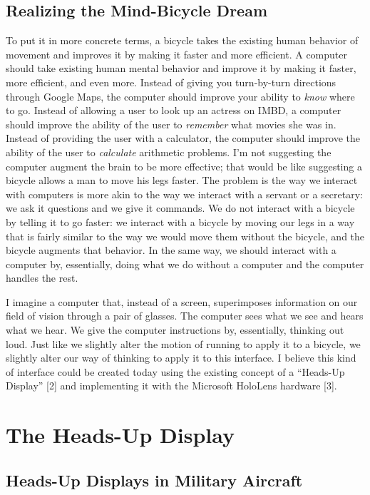 \documentclass[a4paper,12pt]{article}
\begin{document}
\subsection{Realizing the Mind-Bicycle Dream}
To put it in more concrete terms, a bicycle takes the existing human behavior of movement and improves it by making it faster and more efficient. A computer should take existing human mental behavior and improve it by making it faster, more efficient, and even more. Instead of giving you turn-by-turn directions through Google Maps, the computer should improve your ability to \emph{know} where to go. Instead of allowing a user to look up an actress on IMBD, a computer should improve the ability of the user to \emph{remember} what movies she was in. Instead of providing the user with a calculator, the computer should improve the ability of the user to \emph{calculate} arithmetic problems. I'm not suggesting the computer augment the brain to be more effective; that would be like suggesting a bicycle allows a man to move his legs faster. The problem is the way we interact with computers is more akin to the way we interact with a servant or a secretary: we ask it questions and we give it commands. We do not interact with a bicycle by telling it to go faster: we interact with a bicycle by moving our legs in a way that is fairly similar to the way we would move them without the bicycle, and the bicycle augments that behavior. In the same way, we should interact with a computer by, essentially, doing what we do without a computer and the computer handles the rest.

I imagine a computer that, instead of a screen, superimposes information on our field of vision through a pair of glasses. The computer sees what we see and hears what we hear. We give the computer instructions by, essentially, thinking out loud. Just like we slightly alter the motion of running to apply it to a bicycle, we slightly alter our way of thinking to apply it to this interface. I believe this kind of interface could be created today using the existing concept of a ``Heads-Up Display'' [2] and implementing it with the Microsoft HoloLens hardware [3].

\section{The Heads-Up Display}

\subsection{Heads-Up Displays in Military Aircraft}
\end{document}
